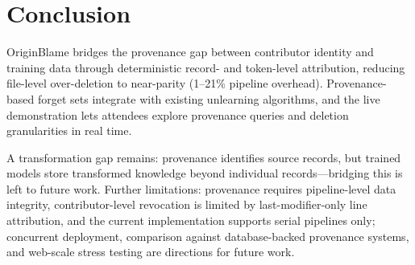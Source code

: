 \section{Conclusion}

OriginBlame bridges the provenance gap between contributor identity and training data through deterministic record- and token-level attribution, reducing file-level over-deletion to near-parity (1--21\% pipeline overhead). Provenance-based forget sets integrate with existing unlearning algorithms, and the live demonstration lets attendees explore provenance queries and deletion granularities in real time.

A transformation gap remains: provenance identifies source records, but trained models store transformed knowledge beyond individual records---bridging this is left to future work. Further limitations: provenance requires pipeline-level data integrity, contributor-level revocation is limited by last-modifier-only line attribution, and the current implementation supports serial pipelines only; concurrent deployment, comparison against database-backed provenance systems, and web-scale stress testing are directions for future work.
